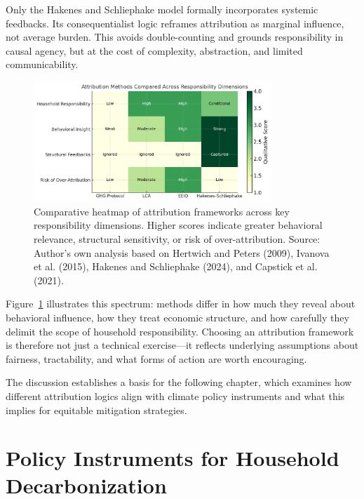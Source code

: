 \documentclass[12pt,a4paper]{article}%
\begin{document}
Only the Hakenes and Schliephake model formally incorporates systemic feedbacks. Its consequentialist logic reframes attribution as marginal influence, not average burden. This avoids double-counting and grounds responsibility in causal agency, but at the cost of complexity, abstraction, and limited communicability.
\begin{figure}[h]
    \centering
    \includegraphics[width=0.8\textwidth]{Heatmap Res.png}
    \caption{\small{Comparative heatmap of attribution frameworks across key responsibility dimensions. Higher scores indicate greater behavioral relevance, structural sensitivity, or risk of over-attribution. Source: Author's own analysis based on Hertwich and Peters (2009), Ivanova et al. (2015), Hakenes and Schliephake (2024), and Capstick et al. (2021).}}\label{fig:heatmap}
\end{figure}
Figure~\ref{fig:heatmap} illustrates this spectrum: methods differ in how much they reveal about behavioral influence, how they treat economic structure, and how carefully they delimit the scope of household responsibility. Choosing an attribution framework is therefore not just a technical exercise—it reflects underlying assumptions about fairness, tractability, and what forms of action are worth encouraging.



\noindent
The discussion establishes a basis for the following chapter, which examines how different attribution logics align with climate policy instruments and what this implies for equitable mitigation strategies.
\section{Policy Instruments for Household Decarbonization}
\end{document}
